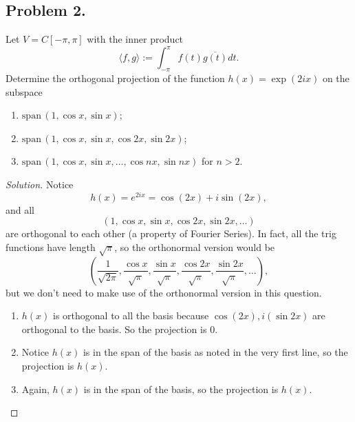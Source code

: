 \documentclass{article}
\newcommand*{\spann}{\ensuremath{\mathrm{span}}\,}
\begin{document}
\newpage
\subsection*{Problem 2.}
Let $V=C[-\pi,\pi]$ with the inner product
$$\langle f, g \rangle := \int_{-\pi}^\pi f(t) \overline{g(t)} dt.$$
Determine the orthogonal projection of the function $h(x)=\exp(2ix)$ on the subspace
\begin{enumerate}[label=(\alph*)]
    \item $\spann (1, \cos x , \sin x)$; 
    \item $\spann (1,\cos x , \sin x, \cos 2x, \sin 2x)$; 
    \item $\spann (1,  \cos x , \sin x, \ldots, \cos nx, \sin nx)$ for $n>2$.
\end{enumerate}
\begin{proof}[Solution]\indent
    Notice $$h(x) = e^{2ix} = \cos(2x) + i\sin(2x),$$
    and all $$(1, \cos x, \sin x, \cos 2x, \sin 2x, \dots)$$ are orthogonal to each other (a property
    of Fourier Series).
    In fact, all the trig functions have length $\sqrt{\pi}$, so the orthonormal version would be 
    $$\left(\frac{1}{\sqrt{2\pi}}, \frac{\cos x}{\sqrt{\pi}}, \frac{\sin x}{\sqrt{\pi}},
    \frac{\cos 2x}{\sqrt{\pi}}, \frac{\sin 2x}{\sqrt{\pi}}, \dots\right),$$ but we don't need 
    to make use of the orthonormal version in this question.
    \begin{enumerate}[label=(\alph*)]
        \item $h(x)$ is orthogonal to all the basis because $\cos(2x), i(\sin 2x)$ are orthogonal 
        to the basis. So the projection is $0$.

        \item Notice $h(x)$ is in the span of the basis as noted in the very first line, so the
        projection is $h(x)$.

        \item Again, $h(x)$ is in the span of the basis, so the projection is $h(x)$.
    \end{enumerate}    
\end{proof}

\newpage
\end{document}
